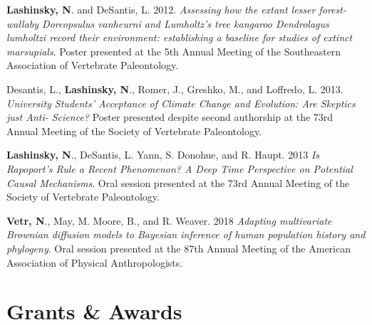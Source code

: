 \documentclass[12pt]{article}
\begin{document}
\begin{enumerate}[label={[\arabic*]}]

\item \textbf{Lashinsky, N}. and DeSantis, L. 2012. \emph{Assessing how the extant lesser forest-wallaby Dorcopsulus vanheurni and Lumholtz’s tree kangaroo Dendrolagus lumholtzi record their environment: establishing a baseline for studies of extinct marsupials}. Poster presented at the 5th Annual Meeting of the Southeastern Association of Vertebrate Paleontology. 

\item Desantis, L., \textbf{Lashinsky, N}., Romer, J., Greshko, M., and Loffredo, L. 2013. \emph{University Students' Acceptance of Climate Change and Evolution: Are Skeptics just Anti- Science?} Poster presented despite second authorship at the 73rd Annual Meeting of the Society of Vertebrate Paleontology. 

\item \textbf{Lashinsky, N}., DeSantis, L. Yann, S. Donohue, and R. Haupt. 2013 \emph{Is Rapoport’s Rule a Recent Phenomenon? A Deep Time Perspective on Potential Causal Mechanisms}. Oral session presented at the 73rd Annual Meeting of the Society of Vertebrate Paleontology. 

\item \textbf{Vetr, N}., May, M. Moore, B., and R. Weaver. 2018 \emph{Adapting multivariate Brownian diffusion models to Bayesian inference of human population history and phylogeny}. Oral session presented at the 87th Annual Meeting of the American Association of Physical Anthropologists.

\end{enumerate}

\section{Grants \& Awards}
\end{document}
